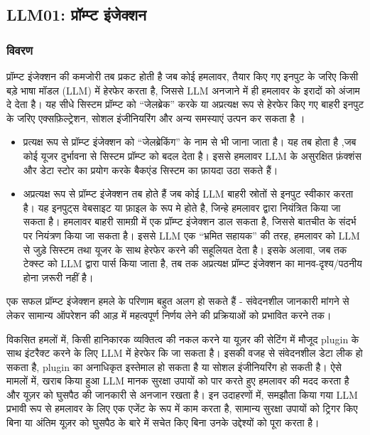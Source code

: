 \documentclass[
]{article}
\author{}
\date{}
\providecommand{\tightlist}{%
  \setlength{\itemsep}{0pt}\setlength{\parskip}{0pt}}
\begin{document}
\subsection{LLM01: प्रॉम्प्ट
इंजेक्शन}\label{llm01-ux92aux930ux92eux92aux91f-ux907ux91cux915ux936ux928}

\subsubsection{विवरण}\label{ux935ux935ux930ux923}

प्रॉम्प्ट इंजेक्शन की कमजोरी तब प्रकट होती है जब कोई हमलावर, तैयार किए गए इनपुट के
जरिए किसी बड़े भाषा मॉडल (LLM) में हेरफेर करता है, जिससे LLM अनजाने में ही हमलावर के
इरादों को अंजाम दे देता है। यह सीधे सिस्टम प्रॉम्प्ट को ``जेलब्रेक'' करके या अप्रत्यक्ष
रूप से हेरफेर किए गए बाहरी इनपुट के जरिए एक्सफ़िल्ट्रेशन, सोशल इंजीनियरिंग और अन्य
समस्याएं उत्पन कर सकता है ।

\begin{itemize}
\tightlist
\item
  प्रत्यक्ष रूप से प्रॉम्प्ट इंजेक्शन को ``जेलब्रेकिंग'' के नाम से भी जाना जाता है। यह तब
  होता है ,जब कोई यूजर दुर्भावना से सिस्टम प्रॉम्प्ट को बदल देता है। इससे हमलावर LLM
  के असुरक्षित फ़ंक्शंस और डेटा स्टोर का प्रयोग करके बैकएंड सिस्टम का फ़ायदा उठा सकते हैं।
\item
  अप्रत्यक्ष रूप से प्रॉम्प्ट इंजेक्शन तब होते हैं जब कोई LLM बाहरी स्रोतों से इनपुट
  स्वीकार करता है। यह इनपुट्स वेबसाइट या फ़ाइल के रूप मे होते है, जिन्हे हमलावर द्वारा
  नियंत्रित किया जा सकता है। हमलावर बाहरी सामग्री में एक प्रॉम्प्ट इंजेक्शन डाल सकता
  है, जिससे बातचीत के संदर्भ पर नियंत्रण किया जा सकता है। इससे LLM एक ``भ्रमित
  सहायक'' की तरह, हमलावर को LLM से जुड़े सिस्टम तथा यूजर के साथ हेरफेर करने की
  सहूलियत देता है। इसके अलावा, जब तक टेक्स्ट को LLM द्वारा पार्स किया जाता है, तब
  तक अप्रत्यक्ष प्रॉम्प्ट इंजेक्शन का मानव-दृश्य/पठनीय होना ज़रूरी नहीं है।
\end{itemize}

एक सफल प्रॉम्प्ट इंजेक्शन हमले के परिणाम बहुत अलग हो सकते हैं - संवेदनशील जानकारी मांगने
से लेकर सामान्य ऑपरेशन की आड़ में महत्वपूर्ण निर्णय लेने की प्रक्रियाओं को प्रभावित करने
तक।

विकसित हमलों में, किसी हानिकारक व्यक्तित्व की नकल करने या यूज़र की सेटिंग में मौजूद
plugin के साथ इंटरैक्ट करने के लिए LLM में हेरफेर कि जा सकता है। इसकी वजह से संवेदनशील
डेटा लीक हो सकता है, plugin का अनाधिकृत इस्तेमाल हो सकता है या सोशल इंजीनियरिंग
हो सकती है। ऐसे मामलों में, खराब किया हुआ LLM मानक सुरक्षा उपायों को पार करते हुए
हमलावर की मदद करता है और यूज़र को घुसपैठ की जानकारी से अनजान रखता है। इन
उदाहरणों में, समझौता किया गया LLM प्रभावी रूप से हमलावर के लिए एक एजेंट के रूप में
काम करता है, सामान्य सुरक्षा उपायों को ट्रिगर किए बिना या अंतिम यूज़र को घुसपैठ के
बारे में सचेत किए बिना उनके उद्देश्यों को पूरा करता है।
\end{document}
